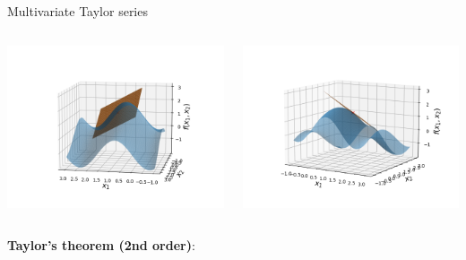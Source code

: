 \begin{vbframe}{Multivariate Taylor series}
\begin{columns}
  \begin{column}{0.4\textwidth}
    \includegraphics[width = \textwidth]{figure_man/Taylor2D/Taylor2D_1st100.png}
  \end{column}
  \begin{column}{0.4\textwidth}
    \includegraphics[width = \textwidth]{figure_man/Taylor2D/Taylor2D_1st301.png}
  \end{column}
\end{columns}

\framebreak 

\textbf{Taylor's theorem (2nd order)}: 


\end{vbframe}

